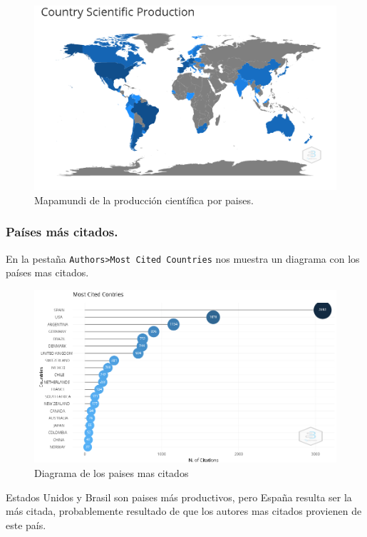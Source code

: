 \documentclass[
]{article}
\begin{document}
\begin{figure}
\centering
\includegraphics{CountryScientificProduction.png}
\caption{Mapamundi de la producción científica por paises.}
\end{figure}

\hypertarget{pauxedses-muxe1s-citados.}{%
\subsubsection{Países más citados.}\label{pauxedses-muxe1s-citados.}}

En la pestaña \texttt{Authors\textgreater{}Most\ Cited\ Countries} nos
muestra un diagrama con los países mas citados.

\begin{figure}
\centering
\includegraphics{MostCitedSources.png}
\caption{Diagrama de los paises mas citados}
\end{figure}

Estados Unidos y Brasil son paises más productivos, pero España resulta
ser la más citada, probablemente resultado de que los autores mas
citados provienen de este país.
\end{document}
